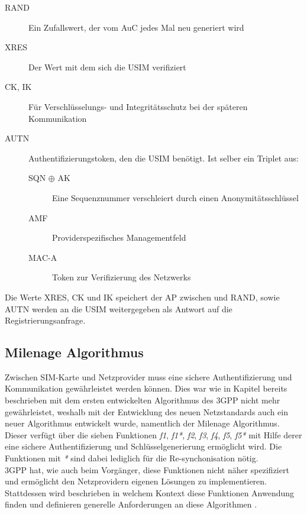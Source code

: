  \begin{description}
  \item [RAND] Ein Zufallswert, der vom AuC jedes Mal neu generiert wird
  \item [XRES] Der Wert mit dem sich die USIM verifiziert
  \item [\ac{CK}, \ac{IK}] Für Verschlüsselungs- und Integritätsschutz bei der späteren Kommunikation
  \item [AUTN] Authentifizierungstoken, den die USIM benötigt. Ist selber ein Triplet aus:
  \begin{description}
   \item [SQN $\oplus$ AK] Eine Sequenznummer verschleiert durch einen Anonymitätsschlüssel
   \item [AMF] Providerspezifisches Managementfeld
   \item [MAC-A] Token zur Verifizierung des Netzwerks
  \end{description}
 \end{description}
 
Die Werte XRES, CK und IK speichert der AP zwischen und RAND, sowie AUTN werden an die USIM
weitergegeben als Antwort auf die Registrierungsanfrage.

\subsection{Milenage Algorithmus}
\label{milenage}
Zwischen \ac{SIM}-Karte und Netzprovider muss eine sichere Authentifizierung und
Kommunikation gewährleistet werden können. Dies war wie in Kapitel 
bereits beschrieben mit dem ersten entwickelten Algorithmus des \ac{3GPP} nicht mehr
gewährleistet, weshalb mit der Entwicklung des neuen Netzstandards auch ein neuer
Algorithmus entwickelt wurde, namentlich der Milenage Algorithmus. \\
Dieser verfügt über die sieben Funktionen \emph{f1}, \emph{f1*}, \emph{f2}, \emph{f3},
\emph{f4}, \emph{f5}, \emph{f5*} mit Hilfe derer eine sichere Authentifizierung und
Schlüsselgenerierung ermöglicht wird. Die Funktionen mit \emph{*} sind dabei lediglich für die
Re-synchonisation nötig. \\
3GPP hat, wie auch beim Vorgänger, diese Funktionen nicht näher spezifiziert und ermöglicht
den Netzprovidern eigenen Lösungen zu implementieren. Stattdessen wird beschrieben in
welchem Kontext diese Funktionen Anwendung finden und definieren generelle Anforderungen
an diese Algorithmen \cite{3gpp.35.205}.

